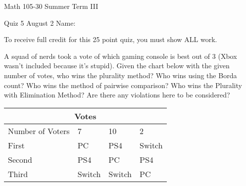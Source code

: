 \documentclass[11pt,epsfig]{article}
\begin{document}
Math 105-30 Summer Term III 

Quiz 5 August 2 \hspace{1.9in} {Name:} {\underline {\hspace{3.5in}}}
\vspace{1pc}

To receive full credit for this 25 point quiz, you must show ALL work.
\vspace{1pc}

\begin{problem}{25}
A squad of nerds took a vote of which gaming console is best out of 3 (Xbox wasn't included because it's stupid). Given the chart below with the given number of votes, who wins the plurality method? Who wins using the Borda count? Who wins the method of pairwise comparison? Who wins the Plurality with Elimination Method? Are there any violations here to be considered?

\begin{tabular}{ |p{3cm}||p{3cm}|p{3cm}|p{3cm}|  }
 \hline
 \multicolumn{4}{|c|}{Votes} \\
 \hline
 Number of Voters &7&10&2\\
 \hline
 First   &    PC      &PS4    &  Switch\\
 Second&  PS4    & PC      &  PS4\\
 Third &    Switch &Switch&  PC\\
 \hline
\end{tabular}

\vfill
\end{problem}





\showpoints
\end{document}
